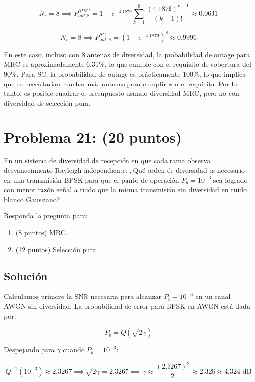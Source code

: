 \documentclass[11pt]{article}
\begin{document}
\begin{enumerate}
    \[
    N_r = 8 \implies P_{out, 8}^{MRC} = 1 - e^{-4.1879} \sum_{k=1}^{8} \frac{\left(4.1879\right)^{k-1}}{(k - 1)!} \approx 0.0631
    \]

    \[
    N_r = 8 \implies P_{out, 8}^{SC} = \left(1 - e^{-4.1879}\right)^{8} \approx 0.9996
    \]

    En este caso, incluso con 8 antenas de diversidad, la probabilidad de outage para MRC es aproximadamente 6.31\%, lo que cumple con el requisito de cobertura del 90\%. Para SC, la probabilidad de outage es prácticamente 100\%, lo que implica que se necesitarían muchas más antenas para cumplir con el requisito. Por lo tanto, es posible cuadrar el presupuesto usando diversidad MRC, pero no con diversidad de selección pura.
\end{enumerate}

\section*{Problema 21: (20 puntos)}

En un sistema de diversidad de recepción en que cada rama observa desvanecimiento Rayleigh independiente, ¿Qué orden de diversidad es necesario en una transmisión BPSK para que el punto de operación $P_b = 10^{-3}$ sea logrado con menor razón señal a ruido que la misma transmisión sin diversidad en ruido blanco Gaussiano?  

Responda la pregunta para:

\begin{enumerate}
    \item (8 puntos) MRC.
    \item (12 puntos) Selección pura.
\end{enumerate}

\subsection*{Solución}

Calculamos primero la SNR necesaria para alcanzar $P_b = 10^{-3}$ en un canal AWGN sin diversidad. La probabilidad de error para BPSK en AWGN está dada por:

\[
P_b = Q\left(\sqrt{2\gamma}\right)
\]

Despejando para $\gamma$ cuando $P_b = 10^{-3}$:

\[
Q^{-1}(10^{-3}) \approx 2.3267 \implies \sqrt{2\gamma} = 2.3267 \implies \gamma \approx \frac{(2.3267)^2}{2} \approx 2.326 \approx 4.324 \text{ dB}
\]
\end{document}
